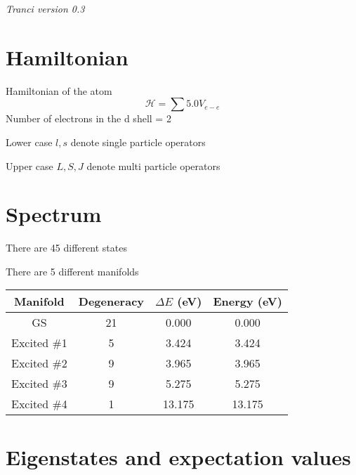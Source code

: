 \documentclass{article}
\begin{document}
\tableofcontents
\textit{Tranci version 0.3}


\section{Hamiltonian}
Hamiltonian of the atom
\begin{equation}
\mathcal{H} = \sum5.0V_{e-e} \end{equation}
Number of electrons in the d shell = 2

Lower case $l,s$ denote single particle operators

Upper case $L,S,J$ denote multi particle operators

\section{Spectrum}


There are 45 different states

There are 5 different manifolds

\begin{center}
\begin{tabular}{| c | c | c| c |}
\hline
Manifold  &  Degeneracy  & $\Delta E$ (eV) & Energy (eV) \\
\hline
GS  &  21   &       0.000  &       0.000  \\
Excited \#1  &  5   &       3.424  &       3.424  \\
Excited \#2  &  9   &       3.965  &       3.965  \\
Excited \#3  &  9   &       5.275  &       5.275  \\
Excited \#4  &  1   &      13.175  &      13.175  \\
\hline
\end{tabular}
\end{center}
\section{Eigenstates and expectation values}
\end{document}
